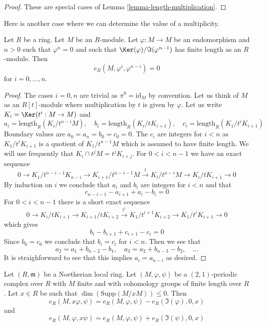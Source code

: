 \begin{proof}
These are special cases of Lemma \ref{lemma-length-multiplication}.
\end{proof}

\noindent
Here is another case where we can determine the value of a multiplicity.

\begin{lemma}
\label{lemma-powers-period-length-zero}
Let $R$ be a ring. Let $M$ be an $R$-module.
Let $\varphi : M \to M$ be an endomorphism and $n > 0$
such that $\varphi^n = 0$ and such that $\Ker(\varphi)/\Im(\varphi^{n - 1})$
has finite length as an $R$-module.
Then
$$
e_R(M, \varphi^i, \varphi^{n - i}) = 0
$$
for $i = 0, \ldots, n$.
\end{lemma}

\begin{proof}
The cases $i = 0, n$ are trivial as $\pi^0 = \text{id}_M$ by convention.
Let us think of $M$ as an $R[t]$-module where multiplication by $t$
is given by $\varphi$. Let us write
$K_i = \Ker(t^i : M \to M)$ and
$$
a_i = \text{length}_R(K_i/t^{n - i}M),\quad
b_i = \text{length}_R(K_i/tK_{i + 1}),\quad
c_i = \text{length}_R(K_1/t^iK_{i + 1})
$$
Boundary values are $a_0 = a_n = b_0 = c_0 = 0$.
The $c_i$ are integers for $i < n$ as $K_1/t^iK_{i + 1}$
is a quotient of $K_1/t^{n - 1}M$ which is assumed to have finite length.
We will use frequently that $K_i \cap t^jM = t^jK_{i + j}$.
For $0 < i < n - 1$ we have an exact sequence
$$
0 \to
K_1/t^{n - i - 1}K_{n - i} \to
K_{i + 1}/t^{n - i - 1}M \xrightarrow{t} K_i/t^{n - i}M
\to K_i/tK_{i + 1} \to 0
$$
By induction on $i$ we conclude that $a_i$ and $b_i$ are
integers for $i < n$ and that
$$
c_{n - i - 1} - a_{i + 1} + a_i - b_i = 0
$$
For $0 < i < n - 1$ there is a short exact sequence
$$
0 \to
K_i/tK_{i + 1} \to
K_{i + 1}/tK_{i + 2} \xrightarrow{t^i}
K_1/t^{i + 1}K_{i + 2} \to
K_1/t^iK_{i + 1} \to 0
$$
which gives
$$
b_i - b_{i + 1} + c_{i + 1} - c_i = 0
$$
Since $b_0 = c_0$ we conclude that $b_i = c_i$ for $i < n$.
Then we see that
$$
a_2 = a_1 + b_{n - 2} - b_1,\quad
a_3 = a_2 + b_{n - 3} - b_2,\quad \ldots
$$
It is straighforward to see that this implies $a_i = a_{n - i}$ as desired.
\end{proof}

\begin{lemma}
\label{lemma-multiply-period-length}
Let $(R, \mathfrak m)$ be a Noetherian local ring. Let
$(M, \varphi, \psi)$ be a $(2, 1)$-periodic complex over $R$
with $M$ finite and with cohomology groups of finite length over $R$.
Let $x \in R$ be such that $\dim(\text{Supp}(M/xM)) \leq 0$. Then
$$
e_R(M, x\varphi, \psi) = e_R(M, \varphi, \psi) - e_R(\Im(\varphi), 0, x)
$$
and
$$
e_R(M, \varphi, x\psi) = e_R(M, \varphi, \psi) + e_R(\Im(\psi), 0, x)
$$
\end{lemma}

